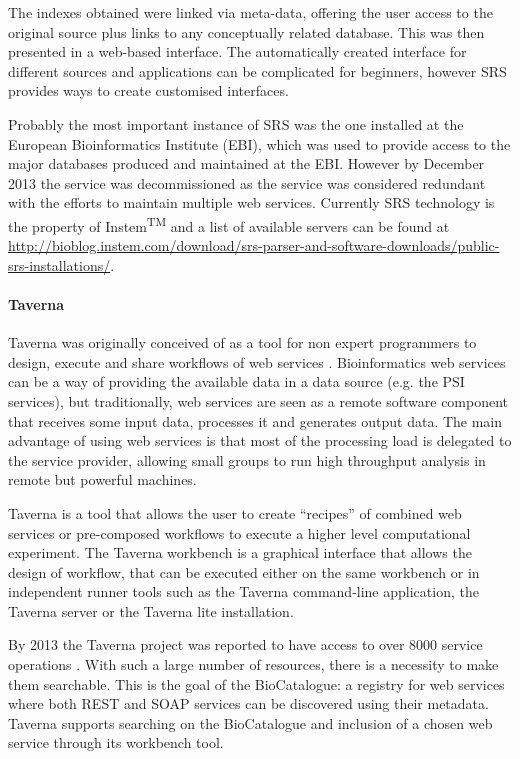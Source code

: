 The  indexes obtained were linked via meta-data, offering the user access to the original source plus links to any conceptually related database. This was then presented in a web-based interface. The automatically created interface for different sources and applications can be complicated for beginners, however SRS provides ways to create customised interfaces.

Probably the most important instance of SRS was the one installed at the European Bioinformatics Institute (EBI), which was used to provide access to the major databases produced and maintained at the EBI. However by December 2013 the service was decommissioned as the service was considered redundant with the efforts to maintain multiple web services. Currently SRS technology is the property of Instem\textsuperscript{TM} and a list of available servers can be found at \url{http://bioblog.instem.com/download/srs-parser-and-software-downloads/public-srs-installations/}.

\paragraph{Taverna}
Taverna was originally conceived of as a tool for non expert programmers to design, execute and share workflows of web services \cite{HUL2006}. Bioinformatics web services can be a way of providing the available data in a data source (e.g. the PSI services), but traditionally, web services are seen as a remote software component that receives some input data, processes it and generates output data. The main advantage of using web services  is that most of the processing load is delegated to the service provider, allowing small groups to run high throughput analysis in remote but powerful machines.

Taverna is a tool that allows the user to create ``recipes'' of combined web services or pre-composed workflows to execute a higher level computational experiment. The Taverna workbench is a graphical interface that allows the design of workflow, that can be executed either on the same workbench or in independent runner tools such as the Taverna command-line application, the Taverna server or the Taverna lite installation.

By 2013 the Taverna project was reported to have access to over 8000 service operations \cite{WOL2013}. With such a large number of resources, there is a necessity to make them searchable. This is the goal of the BioCatalogue: a registry for web services where both REST and SOAP services can be discovered using their metadata. Taverna supports searching on the BioCatalogue and inclusion of a chosen web service through its workbench tool.

